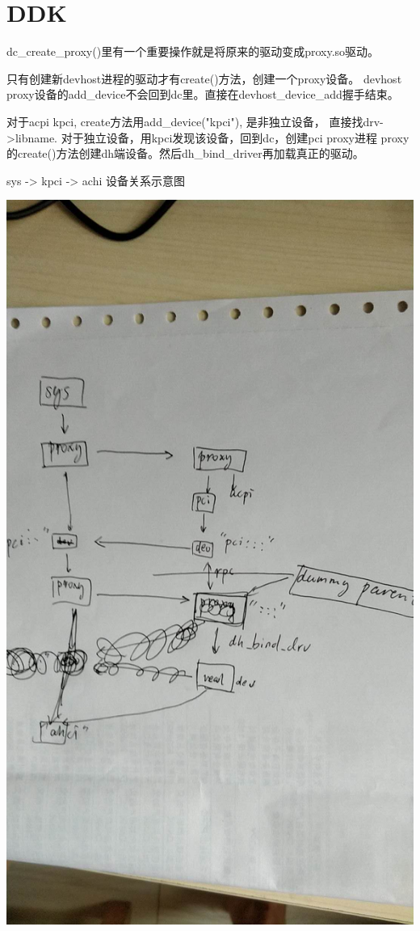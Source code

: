 \section{DDK}

dc_create_proxy()里有一个重要操作就是将原来的驱动变成proxy.so驱动。

只有创建新devhost进程的驱动才有create()方法，创建一个proxy设备。
devhost proxy设备的add_device不会回到dc里。直接在devhost_device_add握手结束。

对于acpi kpci, create方法用add_device("kpci"), 是非独立设备，
直接找drv->libname. 对于独立设备，用kpci发现该设备，回到dc，创建pci proxy进程
proxy的create()方法创建dh端设备。然后dh_bind_driver再加载真正的驱动。

sys -> kpci -> achi 设备关系示意图

\includegraphics[scale=0.3]{devdrv.jpeg}

